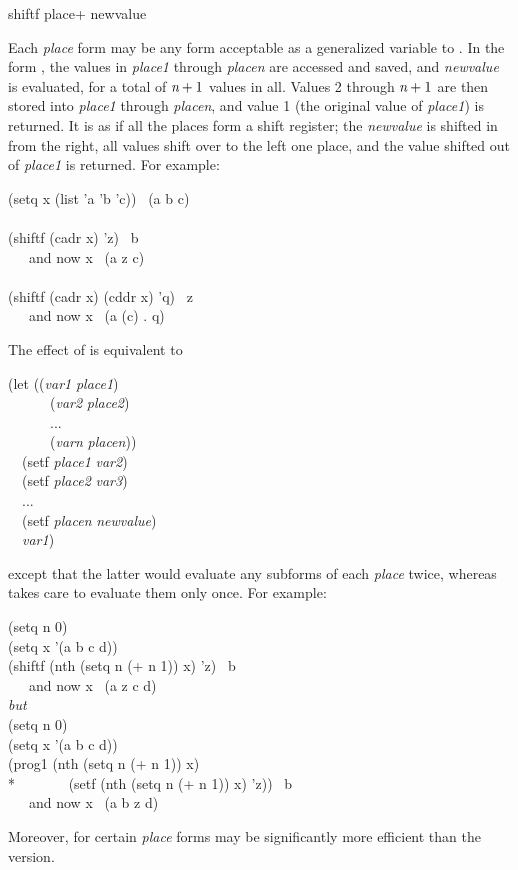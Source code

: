 \begin{defmac}
shiftf {place}+ newvalue

Each \emph{place} form may be any form acceptable
as a generalized variable to .
In the form ,
the values in \emph{place1} through \emph{placen} are accessed and saved,
and \emph{newvalue} is evaluated, for a total of $\emph{n}+1$ values in all.
Values 2 through $\emph{n}+1$ are then stored into \emph{place1} through \emph{placen},
and value 1 (the original value of \emph{place1}) is returned.
It is as if all the places form a shift register; the \emph{newvalue}
is shifted in from the right, all values shift over to the left one place,
and the value shifted out of \emph{place1} is returned.  For example:
\begin{lisp}
(setq x (list 'a 'b 'c)) \EV\ (a b c) \\
 \\
(shiftf (cadr x) 'z) \EV\ b \\
~~~\textrm{and now} x \EV\ (a z c) \\
 \\
(shiftf (cadr x) (cddr x) 'q) \EV\ z \\
~~~\textrm{and now} x \EV\ (a (c) . q)
\end{lisp}
The effect of 
is equivalent to
\begin{lisp}
(let ((\emph{var1} \emph{place1}) \\
~~~~~~(\emph{var2} \emph{place2}) \\
~~~~~~... \\
~~~~~~(\emph{varn} \emph{placen})) \\
~~(setf \emph{place1} \emph{var2}) \\
~~(setf \emph{place2} \emph{var3}) \\
~~... \\
~~(setf \emph{placen} \emph{newvalue}) \\
~~\emph{var1})
\end{lisp}
except that the latter would evaluate any subforms of each \emph{place} twice,
whereas  takes care to evaluate them only once.
For example:
\begin{lisp}
(setq n 0) \\
(setq x '(a b c d)) \\
(shiftf (nth (setq n (+ n 1)) x) 'z) \EV\ b \\
~~~\textrm{and now} x \EV\ (a z c d) \\[4pt]
\emph{but} \\[4pt]
(setq n 0) \\
(setq x '(a b c d)) \\
(prog1 (nth (setq n (+ n 1)) x) \\*
~~~~~~~(setf (nth (setq n (+ n 1)) x) 'z)) \EV\ b \\
~~~\textrm{and now} x \EV\ (a b z d)
\end{lisp}
Moreover, for certain \emph{place} forms  may be
significantly more efficient than the  version.


\end{defmac}
